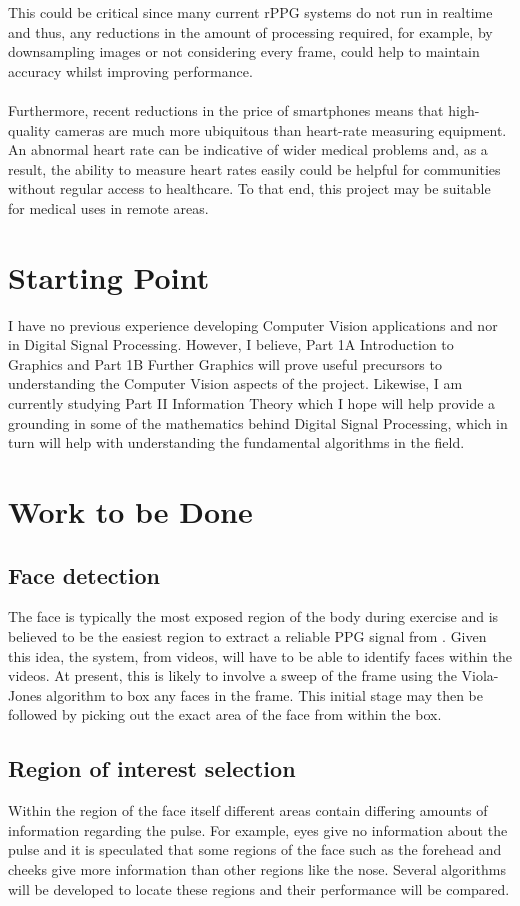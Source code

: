 This could be critical since many current rPPG systems do not run in realtime and thus, any reductions in the amount of processing required, for example, by downsampling images or not considering every frame, could help to maintain accuracy whilst improving performance. \\\\
Furthermore, recent reductions in the price of smartphones means that high-quality cameras are much more ubiquitous than heart-rate measuring equipment. An abnormal heart rate can be indicative of wider medical problems and, as a result, the ability to measure heart rates easily could be helpful for communities without regular access to healthcare. To that end, this project may be suitable for medical uses in remote areas.

\section*{Starting Point}
I have no previous experience developing Computer Vision applications and nor in Digital Signal Processing. However, I believe, Part 1A Introduction to Graphics and Part 1B Further Graphics will prove useful precursors to understanding the Computer Vision aspects of the project. Likewise, I am currently studying Part II Information Theory which I hope will help provide a grounding in some of the mathematics behind Digital Signal Processing, which in turn will help with understanding the fundamental algorithms in the field.

\section*{Work to be Done}
\subsection*{Face detection}
The face is typically the most exposed region of the body during exercise and is believed to be the easiest region to extract a reliable PPG signal from \cite{vanderKooij2019}. Given this idea, the system, from videos, will have to be able to identify faces within the videos. At present, this is likely to involve a sweep of the frame using the Viola-Jones algorithm to box any faces in the frame. This initial stage may then be followed by picking out the exact area of the face from within the box.

\subsection*{Region of interest selection}
Within the region of the face itself different areas contain differing amounts of information regarding the pulse. For example, eyes give no information about the pulse and it is speculated that some regions of the face such as the forehead and cheeks give more information than other regions like the nose. Several algorithms will be developed to locate these regions and their performance will be compared.

